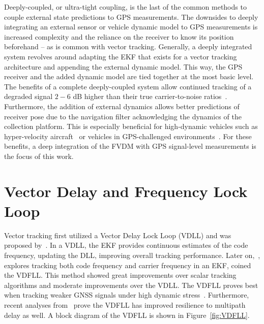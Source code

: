 {Deeply-coupled}, or ultra-tight coupling, is the last of the common methods to couple external state predictions to GPS measurements. The downsides to deeply integrating an external sensor or vehicle dynamic model to GPS measurements is increased complexity and the reliance on the receiver to know its position beforehand {--} as is common with vector tracking. Generally, a deeply integrated system revolves around adapting the EKF that exists for a vector tracking architecture and appending the external dynamic model. This way, the GPS receiver and the added dynamic model are tied together at the most basic level. The benefits of a complete deeply-coupled system allow continued tracking of a degraded signal \(2-6\) dB higher than their true carrier-to-noise ratios~\cite{wattsGPSGLONASSL12019}. Furthermore, the addition of external dynamics allows better predictions of receiver pose due to the navigation filter acknowledging the dynamics of the collection platform. This is especially beneficial for high-dynamic vehicles such as hyper-velocity aircraft~\cite{pozzobonSupersonicGNSSAuthentication2014} or vehicles in GPS-challenged environments~\cite{martinGPSCarrierPhase2017}. For these benefits, a deep integration of the FVDM with GPS signal-level measurements is the focus of this work.

\section{\textbf{Vector Delay and Frequency Lock Loop}}
Vector tracking first utilized a Vector Delay Lock Loop (VDLL) and was proposed by~\cite{e.m.coppsOptimalProcessingGPS1980}. In a VDLL\@, the EKF provides continuous estimates of the code frequency, updating the DLL, improving overall tracking performance. Later on,~\cite{bradfordparkinsonGlobalPositioningSystem1996}, explores tracking both code frequency and carrier frequency in an EKF, coined the VDFLL\@. This method showed great improvements over scalar tracking algorithms and moderate improvements over the VDLL\@. The VDFLL proves best when tracking weaker GNSS signals under high dynamic stress~\cite{lashleyPerformanceAnalysisVector2009}. Furthermore, recent analyses from~\cite{ziedanMultipathChannelEstimation2012} prove the VDFLL has improved resilience to multipath delay as well. A block diagram of the VDFLL is shown in Figure~\ref{fig:VDFLL}.

